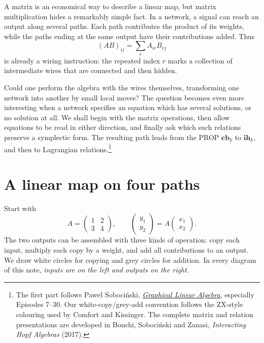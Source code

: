 
A matrix is an economical way to describe a linear map, but matrix multiplication hides a remarkably simple fact. In a network, a signal can reach an output along several paths. Each path contributes the product of its weights, while the paths ending at the same output have their contributions added. Thus
\[
 (AB)_{ij}=\sum_r A_{ir}B_{rj}
\]
is already a wiring instruction: the repeated index \(r\) marks a collection of intermediate wires that are connected and then hidden.

Could one perform the algebra with the wires themselves, transforming one network into another by small local moves? The question becomes even more interesting when a network specifies an equation which has several solutions, or no solution at all. We shall begin with the matrix operations, then allow equations to be read in either direction, and finally ask which such relations preserve a symplectic form. The resulting path leads from the PROP \(\mathbf{cb}_k\) to \(\mathbf{ih}_k\), and then to Lagrangian relations.\footnote{The first part follows Pawe\l{} Soboci\'nski, \href{https://graphicallinearalgebra.net/}{\emph{Graphical Linear Algebra}}, especially Episodes 7--30. Our white-copy/grey-add convention follows the ZX-style colouring used by Comfort and Kissinger. The complete matrix and relation presentations are developed in Bonchi, Soboci\'nski and Zanasi, \emph{Interacting Hopf Algebras} (2017).}

\section{A linear map on four paths}

Start with
\[
 A=\begin{pmatrix}1&2\\3&4\end{pmatrix},\qquad
 \begin{pmatrix}y_1\\y_2\end{pmatrix}
 =A\begin{pmatrix}x_1\\x_2\end{pmatrix}.
\]
The two outputs can be assembled with three kinds of operation: copy each input, multiply each copy by a weight, and add all contributions to an output. We draw white circles for copying and grey circles for addition. In every diagram of this note, \emph{inputs are on the left and outputs on the right}.

